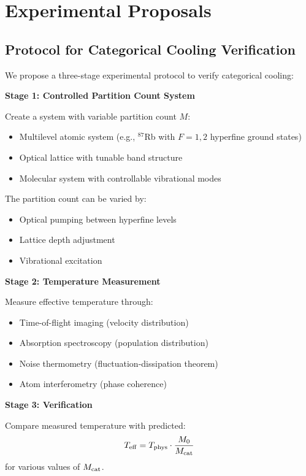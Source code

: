 \section{Experimental Proposals}

\subsection{Protocol for Categorical Cooling Verification}

We propose a three-stage experimental protocol to verify categorical cooling:

\textbf{Stage 1: Controlled Partition Count System}

Create a system with variable partition count $M$:
\begin{itemize}
    \item Multilevel atomic system (e.g., $^{87}$Rb with $F = 1, 2$ hyperfine ground states)
    \item Optical lattice with tunable band structure
    \item Molecular system with controllable vibrational modes
\end{itemize}

The partition count can be varied by:
\begin{itemize}
    \item Optical pumping between hyperfine levels
    \item Lattice depth adjustment
    \item Vibrational excitation
\end{itemize}

\textbf{Stage 2: Temperature Measurement}

Measure effective temperature through:
\begin{itemize}
    \item Time-of-flight imaging (velocity distribution)
    \item Absorption spectroscopy (population distribution)
    \item Noise thermometry (fluctuation-dissipation theorem)
    \item Atom interferometry (phase coherence)
\end{itemize}

\textbf{Stage 3: Verification}

Compare measured temperature with predicted:
\begin{equation}
T_{\mathrm{eff}} = T_{\mathrm{phys}} \cdot \frac{M_0}{M_{\mathrm{cat}}}
\end{equation}
for various values of $M_{\mathrm{cat}}$.

